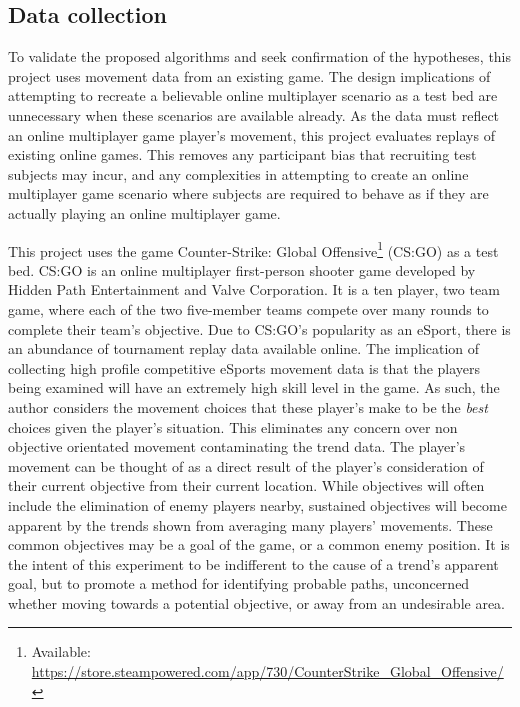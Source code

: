 \documentclass[journal]{IEEEtran}
\begin{document}
\subsection{Data collection} \label{datacollection}

To validate the proposed algorithms and seek confirmation of the hypotheses, this project uses movement data from an existing game. The design implications of attempting to recreate a believable online multiplayer scenario as a test bed are unnecessary when these scenarios are available already. As the data must reflect an online multiplayer game player's movement, this project evaluates replays of existing online games. This removes any participant bias that recruiting test subjects may incur, and any complexities in attempting to create an online multiplayer game scenario where subjects are required to behave as if they are actually playing an online multiplayer game.

This project uses the game Counter-Strike: Global Offensive\footnote[1]{Available: \url{https://store.steampowered.com/app/730/CounterStrike_Global_Offensive/}} (CS:GO) as a test bed. CS:GO is an online multiplayer first-person shooter game developed by Hidden Path Entertainment and Valve Corporation. It is a ten player, two team game, where each of the two five-member teams compete over many rounds to complete their team's objective. Due to CS:GO's popularity as an eSport, there is an abundance of tournament replay data available online. The implication of collecting high profile competitive eSports movement data is that the players being examined will have an extremely high skill level in the game. As such, the author considers the movement choices that these player's make to be the \textit{best} choices given the player's situation. This eliminates any concern over non objective orientated movement contaminating the trend data. The player's movement can be thought of as a direct result of the player's consideration of their current objective from their current location. While objectives will often include the elimination of enemy players nearby, sustained objectives will become apparent by the trends shown from averaging many players' movements. These common objectives may be a goal of the game, or a common enemy position. It is the intent of this experiment to be indifferent to the cause of a trend's apparent goal, but to promote a method for identifying probable paths, unconcerned whether moving towards a potential objective, or away from an undesirable area.
\end{document}
